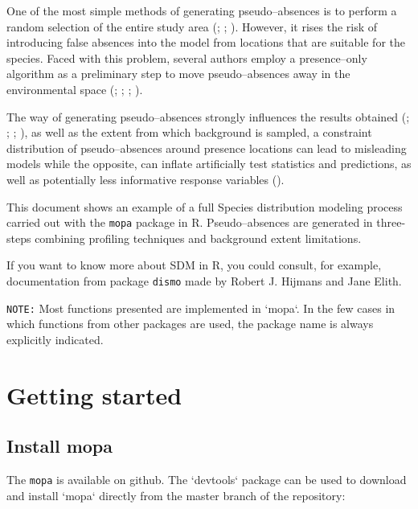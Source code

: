 \documentclass[10pt,a4paper]{report}
\begin{document}
One of the most simple methods of generating pseudo--absences is to perform a random selection of the entire study area  (\citet{jiang_satellite-derived_2014}; \citet{maria_teresa_multi-temporal_2014}; \citet{sequeira_predicting_2014}). However, it rises the risk of introducing false absences into the model from locations that are suitable for the species. Faced with this problem, several authors employ a presence--only algorithm as a preliminary step to move pseudo--absences away in the environmental space (\citet{zaniewski_predicting_2002}; \citet{engler_improved_2004}; \citet{barbet-massin_selecting_2012}; \citet{liu_species_2013}). 

The way of generating pseudo--absences strongly influences the results obtained (\citet{lobo_uncertain_2010}; \citet{wisz_pseudo-absence_2009}; \citet{barbet-massin_selecting_2012}; \citet{hirzel_assessing_2001}), as well as the extent from which background is sampled, a constraint distribution of pseudo--absences around presence locations can lead to misleading models while the opposite, can inflate artificially test statistics and predictions, as well as potentially less informative response variables  (\citet{jeremy_vanderwal_selecting_2009}).

This document shows an example of a full Species distribution modeling process carried out with the \texttt{mopa} package in R. Pseudo--absences are generated in three-steps combining profiling techniques and background extent limitations. 

If you want to know more about SDM in R, you could consult, for example, documentation from package \texttt{dismo} made by Robert J. Hijmans and Jane Elith.


\texttt{NOTE:} Most functions presented are implemented in `mopa`. In the few cases in which functions from other packages are used, the package name is always explicitly indicated.

\chapter{Getting started}

\section{Install mopa}

The \texttt{mopa} is available on github. The `devtools` package can be used to download and install `mopa` directly from the master branch of the repository:
\end{document}
